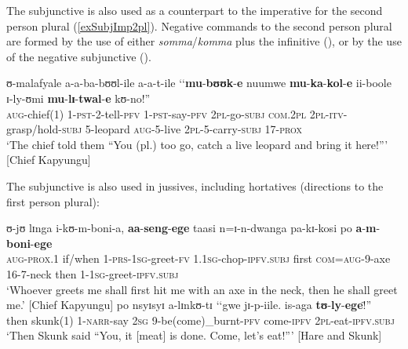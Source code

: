 The subjunctive is also used as a counterpart to the imperative for the second person plural (\ref{exSubjImp2pl}). Negative commands to the second person plural are formed by the use of either \textit{somma}/\textit{komma} plus the infinitive (), or by the use of the negative subjunctive ().
\begin{exe}
\ex \label{exSubjImp2pl}\gll ʊ-malafyale a-a-ba-bʊʊl-ile a-a-t-ile \textup{\lq\lq}\textbf{mu}-\textbf{bʊʊk}-\textbf{e} nuumwe \textbf{mu}-\textbf{ka}-\textbf{kol}-\textbf{e} ii-boole ɪ-ly-ʊmi \textbf{mu}-\textbf{lɪ}-\textbf{twal}-\textbf{e} kʊ-no!\textup{''}\\
\textsc{aug}-chief(1) 1-\textsc{pst}-2-tell-\textsc{pfv} 1-\textsc{pst}-say-\textsc{pfv} \phantom{\lq\lq}\textsc{2pl}-go-\textsc{subj} \textsc{com.2pl} \textsc{2pl}-\textsc{itv}-grasp/hold-\textsc{subj} 5-leopard \textsc{aug}-5-live \textsc{2pl}-5-carry-\textsc{subj} 17-\textsc{prox}\\
\sn `The chief told them ``You (pl.) too go, catch a live leopard and bring it here!''{}' [Chief Kapyungu]
\end{exe}

The subjunctive is also used in jussives, including hortatives (directions to the first person plural):
\begin{exe}
\ex \gll ʊ-jʊ lɪnga i-kʊ-m-boni-a, \textbf{aa}-\textbf{seng}-\textbf{ege} taasi n=ɪ-n-dwanga pa-kɪ-kosi po \textbf{a}-\textbf{m}-\textbf{boni}-\textbf{ege}\\
\textsc{aug}-\textsc{prox.1} if/when 1-\textsc{prs}-\textsc{1sg}-greet-\textsc{fv} 1.\textsc{1sg}-chop-\textsc{ipfv.subj} first \textsc{com}=\textsc{aug}-9-axe 16-7-neck then 1-\textsc{1sg}-greet-\textsc{ipfv.subj}\\
\glt `Whoever greets me shall first hit me with an axe in the neck, then he shall greet me.' [Chief Kapyungu]
\ex \gll po nsyɪsyɪ a-lɪnkʊ-tɪ \textup{\lq\lq}gwe jɪ-p-iile. is-aga \textbf{tʊ}-\textbf{ly}-\textbf{ege}!\textup{̈''}\\
then skunk(1) 1-\textsc{narr}-say \phantom{\lq\lq}\textsc{2sg} 9-be(come)\_burnt-\textsc{pfv} come-\textsc{ipfv} \textsc{2pl}-eat-\textsc{ipfv.subj}\\
\glt `Then Skunk said ``You, it [meat] is done. Come, let's eat!''{}' [Hare and Skunk]
\end{exe}

